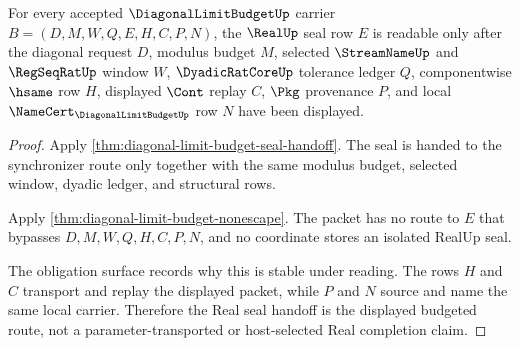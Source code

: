 \begin{theorem}
\label{thm:diagonal-limit-budget-real-seal-handoff}
For every accepted $\DiagonalLimitBudgetUp$ carrier $B=(D,M,W,Q,E,H,C,P,N)$, the $\RealUp$ seal row $E$ is readable only after the diagonal request $D$, modulus budget $M$, selected $\StreamNameUp$ and $\RegSeqRatUp$ window $W$, $\DyadicRatCoreUp$ tolerance ledger $Q$, componentwise $\hsame$ row $H$, displayed $\Cont$ replay $C$, $\Pkg$ provenance $P$, and local $\NameCert_{\DiagonalLimitBudgetUp}$ row $N$ have been displayed.
\end{theorem}
\begin{proof}
Apply \autoref{thm:diagonal-limit-budget-seal-handoff}. The seal is handed to the synchronizer route only together with the same modulus budget, selected window, dyadic ledger, and structural rows.

Apply \autoref{thm:diagonal-limit-budget-nonescape}. The packet has no route to $E$ that bypasses $D,M,W,Q,H,C,P,N$, and no coordinate stores an isolated RealUp seal.

The obligation surface records why this is stable under reading. The rows $H$ and $C$ transport and replay the displayed packet, while $P$ and $N$ source and name the same local carrier. Therefore the Real seal handoff is the displayed budgeted route, not a parameter-transported or host-selected Real completion claim.
\end{proof}


